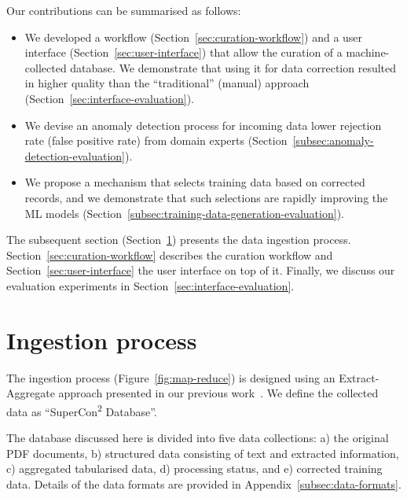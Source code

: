 \documentclass[]{interact}
\theoremstyle{plain} %
\theoremstyle{definition}
\theoremstyle{remark}
\begin{document}
Our contributions can be summarised as follows:
\begin{itemize}
    \item We developed a workflow (Section~\ref{sec:curation-workflow}) and a user interface (Section~\ref{sec:user-interface}) that allow the curation of a machine-collected database. We demonstrate that using it for data correction resulted in higher quality than the ``traditional'' (manual) approach (Section~\ref{sec:interface-evaluation}).
    \item We devise an anomaly detection process for incoming data lower rejection rate (false positive rate) from domain experts (Section~\ref{subsec:anomaly-detection-evaluation}).
    \item We propose a mechanism that selects training data based on corrected records, and we demonstrate that such selections are rapidly improving the ML models (Section~\ref{subsec:training-data-generation-evaluation}).
\end{itemize}

The subsequent section (Section~\ref{sec:ingestion}) presents the data ingestion process.
Section~\ref{sec:curation-workflow} describes the curation workflow and Section~\ref{sec:user-interface} the user interface on top of it.
Finally, we discuss our evaluation experiments in Section~\ref{sec:interface-evaluation}. 


\section{Ingestion process}
\label{sec:ingestion}

The ingestion process (Figure~\ref{fig:map-reduce}) is designed using an Extract-Aggregate approach presented in our previous work~\cite{lfoppiano2023automatic}. 
We define the collected data as ``SuperCon\textsuperscript{2} Database''.

The database discussed here is divided into five data collections: a) the original PDF documents, b) structured data consisting of text and extracted information, c) aggregated tabularised data, d) processing status, and e) corrected training data. 
Details of the data formats are provided in Appendix~\ref{subsec:data-formats}.
\end{document}

